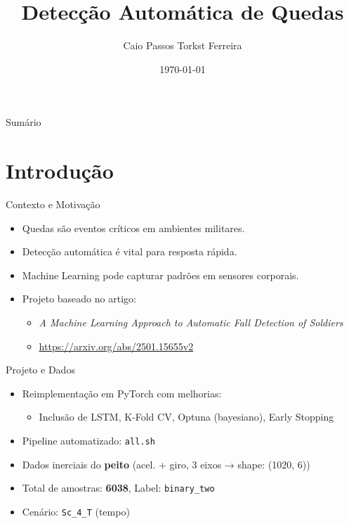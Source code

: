 \documentclass[10pt]{beamer}
\title{Detecção Automática de Quedas}
\author{Caio Passos Torkst Ferreira}
\date{\today}
\begin{document}
\begin{frame}
  \titlepage
\end{frame}

\begin{frame}{Sumário}
  \tableofcontents
\end{frame}

\section{Introdução}

\begin{frame}{Contexto e Motivação}
  \begin{itemize}
    \item Quedas são eventos críticos em ambientes militares.
    \item Detecção automática é vital para resposta rápida.
    \item Machine Learning pode capturar padrões em sensores corporais.
    \item Projeto baseado no artigo:
    \begin{itemize}
      \item \textit{A Machine Learning Approach to Automatic Fall Detection of Soldiers}
      \item \url{https://arxiv.org/abs/2501.15655v2}
    \end{itemize}
  \end{itemize}
\end{frame}



\begin{frame}{Projeto e Dados}
  \begin{itemize}
    \item Reimplementação em PyTorch com melhorias:
    \begin{itemize}
      \item Inclusão de LSTM, K-Fold CV, Optuna (bayesiano), Early Stopping
    \end{itemize}
    \item Pipeline automatizado: \texttt{all.sh}
    \item Dados inerciais do \textbf{peito} (acel. + giro, 3 eixos → shape: (1020, 6))
    \item Total de amostras: \textbf{6038}, Label: \texttt{binary\_two}
    \item Cenário: \texttt{Sc\_4\_T} (tempo)
  \end{itemize}
\end{frame}
\end{document}
